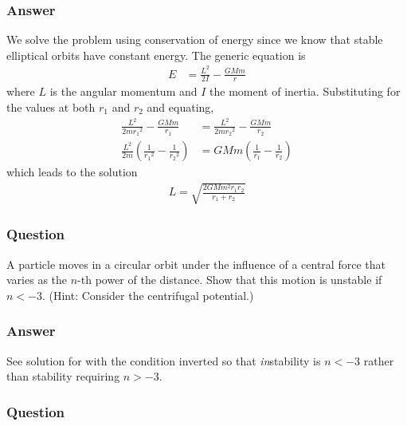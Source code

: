 \subsubsection{Answer}
We solve the problem using conservation of energy since we know that stable
elliptical orbits have constant energy. The generic equation is
\begin{align*}
	E &= \frac{L^2}{2I} - \frac{GMm}{r}
\end{align*}
where $L$ is the angular momentum and $I$ the moment of inertia. Substituting
for the values at both $r_1$ and $r_2$ and equating,
\begin{align*}
	\frac{L^2}{2m{r_1}^2} - \frac{GMm}{r_1} &= \frac{L^2}{2m{r_2}^2} - \frac{GMm}{r_2}\\
	\frac{L^2}{2m}(\frac{1}{{r_1}^2} - \frac{1}{{r_2}^2}) &=
		GMm(\frac{1}{r_1} - \frac{1}{r_2})
\end{align*}
which leads to the solution
\begin{align}
	\boxed{
	L = \sqrt{ \frac{2GMm^2 r_1 r_2}{r_1 + r_2} }
	}
\end{align}

\subsubsection{Question}

A particle moves in a circular orbit under the influence of a central force
that varies as the $n$-th power of the distance. Show that this motion is
unstable if $n < -3$. (Hint: Consider the centrifugal potential.)

\subsubsection{Answer}
See solution for  with the condition inverted so
that \emph{in}stability is $n < -3$ rather than stability requiring $n > -3$.

\subsubsection{Question}

